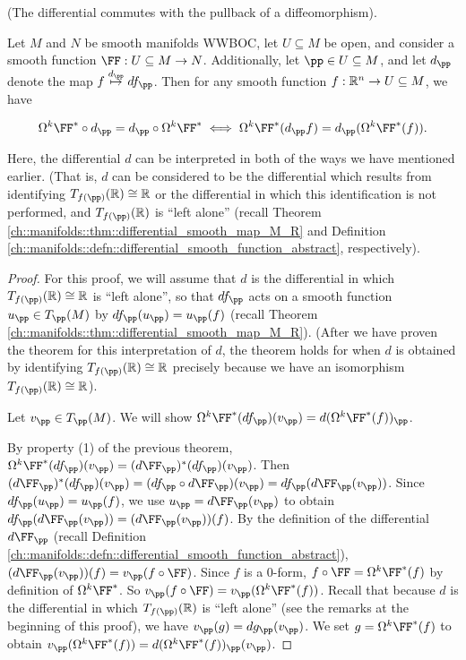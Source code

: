 \begin{theorem}
\label{ch::diff_forms::theorem::differential_commutes_with_diffeomorphism_pullback}
    (The differential commutes with the pullback of a diffeomorphism).
    
    Let $M$ and $N$ be smooth manifolds WWBOC, let $U \subseteq M$ be open, and consider a smooth function $\FF:U \subseteq M \rightarrow N$. Additionally, let $\pp \in U \subseteq M$, and let $d_\pp$ denote the map $f \overset{d_\pp}{\mapsto} df_\pp$. Then for any smooth function ${f:\mathbb{R}^n \rightarrow U \subseteq M}$, we have
        
    \begin{align*}
        \Omega ^k \FF^* \circ d_\pp = d_\pp \circ \Omega ^k \FF^* \iff \Omega ^k \FF^*(d_\pp f) = d_\pp ( \Omega ^k \FF^*(f) ).
    \end{align*}
        
    Here, the differential $d$ can be interpreted in both of the ways we have mentioned earlier. (That is, $d$ can be considered to be the differential which results from identifying $T_{f(\pp)}(\R) \cong \R$ or the differential in which this identification is not performed, and $T_{f(\pp)}(\R)$ is ``left alone'' (recall Theorem \ref{ch::manifolds::thm::differential_smooth_map_M_R} and Definition \ref{ch::manifolds::defn::differential_smooth_function_abstract}, respectively).
\end{theorem}

\begin{proof}
        For this proof, we will assume that $d$ is the differential in which $T_{f(\pp)}(\R) \cong \R$ is ``left alone'', so that $df_\pp$ acts on a smooth function $u_\pp \in T_\pp(M)$ by $df_\pp(u_\pp) = u_\pp(f)$ (recall Theorem \ref{ch::manifolds::thm::differential_smooth_map_M_R}). (After we have proven the theorem for this interpretation of $d$, the theorem holds for when $d$ is obtained by identifying $T_{f(\pp)}(\R) \cong \R$ precisely because we have an isomorphism $T_{f(\pp)}(\R) \cong \R$).
        
        Let $v_\pp \in T_\pp(M)$. We will show $\Omega^k \FF^*(df_\pp)(v_\pp) = d(\Omega^k \FF^*(f))_\pp$.
        
        By property (1) of the previous theorem, $\Omega^k \FF^*(df_\pp)(v_\pp) = (d \FF_\pp)^*(df_\pp)(v_\pp)$. Then $(d \FF_\pp)^*(df_\pp)(v_\pp) = (df_\pp \circ d\FF_\pp)(v_\pp) = df_\pp(d\FF_\pp(v_\pp))$. Since $df_\pp(u_\pp) = u_\pp(f)$, we use $u_\pp = d\FF_\pp(v_\pp)$ to obtain  $df_\pp(d\FF_\pp(v_\pp)) = (d\FF_\pp(v_\pp))(f)$. By the definition of the differential $d\FF_\pp$ (recall Definition \ref{ch::manifolds::defn::differential_smooth_function_abstract}), $(d\FF_\pp(v_\pp))(f) = v_\pp(f \circ \FF)$. Since $f$ is a $0$-form, $f \circ \FF = \Omega^k \FF^*(f)$ by definition of $\Omega^k \FF^*$. So $v_\pp(f \circ \FF) = v_\pp(\Omega^k \FF^*(f))$. Recall that because $d$ is the differential in which $T_{f(\pp)}(\R)$ is ``left alone'' (see the remarks at the beginning of this proof), we have $v_\pp(g) = dg_\pp(v_\pp)$. We set $g = \Omega^k \FF^*(f)$ to obtain $v_\pp(\Omega^k \FF^*(f)) = d(\Omega^k \FF^*(f))_\pp(v_\pp)$.
\end{proof}


